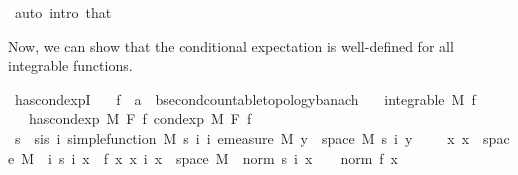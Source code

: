\begin{isabellebody}
\ {\isacharparenleft}{\kern0pt}auto\ intro{\isacharbang}{\kern0pt}{\isacharcolon}{\kern0pt}\ that{\isacharparenright}{\kern0pt}\isanewline
{}\isamarkupfalse%
%
\endisatagproof
{\isafoldproof}%
%
\isadelimproof
%
\endisadelimproof
%
\begin{isamarkuptext}%
Now, we can show that the conditional expectation is well-defined for all integrable functions.%
\end{isamarkuptext}\isamarkuptrue%
\isamarkupfalse%
\ has{\isacharunderscore}{\kern0pt}cond{\isacharunderscore}{\kern0pt}expI{\isacharcolon}{\kern0pt}\isanewline
\ \ \ f\ {\isacharcolon}{\kern0pt}{\isacharcolon}{\kern0pt}\ {\isachardoublequoteopen}{\isacharprime}{\kern0pt}a\ {\isasymRightarrow}\ {\isacharprime}{\kern0pt}b{\isacharcolon}{\kern0pt}{\isacharcolon}{\kern0pt}{\isacharbraceleft}{\kern0pt}second{\isacharunderscore}{\kern0pt}countable{\isacharunderscore}{\kern0pt}topology{\isacharcomma}{\kern0pt}banach{\isacharbraceright}{\kern0pt}{\isachardoublequoteclose}\isanewline
\ \ \ {\isachardoublequoteopen}integrable\ M\ f{\isachardoublequoteclose}\isanewline
\ \ \ {\isachardoublequoteopen}has{\isacharunderscore}{\kern0pt}cond{\isacharunderscore}{\kern0pt}exp\ M\ F\ f\ {\isacharparenleft}{\kern0pt}cond{\isacharunderscore}{\kern0pt}exp\ M\ F\ f{\isacharparenright}{\kern0pt}{\isachardoublequoteclose}\isanewline
%
\isadelimproof
%
\endisadelimproof
%
\isatagproof
{}\isamarkupfalse%
\ {\isacharminus}{\kern0pt}\isanewline
\ \ \isamarkupfalse%
\ s\ \ s{\isacharunderscore}{\kern0pt}is{\isacharcolon}{\kern0pt}\ {\isachardoublequoteopen}{\isasymAnd}i{\isachardot}{\kern0pt}\ simple{\isacharunderscore}{\kern0pt}function\ M\ {\isacharparenleft}{\kern0pt}s\ i{\isacharparenright}{\kern0pt}{\isachardoublequoteclose}\ {\isachardoublequoteopen}{\isasymAnd}i{\isachardot}{\kern0pt}\ emeasure\ M\ {\isacharbraceleft}{\kern0pt}y\ {\isasymin}\ space\ M{\isachardot}{\kern0pt}\ s\ i\ y\ {\isasymnoteq}\ {}{\isacharbraceright}{\kern0pt}\ {\isasymnoteq}\ {\isasyminfinity}{\isachardoublequoteclose}\ {\isachardoublequoteopen}{\isasymAnd}x{\isachardot}{\kern0pt}\ x\ {\isasymin}\ space\ M\ {\isasymLongrightarrow}\ {\isacharparenleft}{\kern0pt}{\isasymlambda}i{\isachardot}{\kern0pt}\ s\ i\ x{\isacharparenright}{\kern0pt}\ {\isasymlonglonglongrightarrow}\ f\ x{\isachardoublequoteclose}\ {\isachardoublequoteopen}{\isasymAnd}x\ i{\isachardot}{\kern0pt}\ x\ {\isasymin}\ space\ M\ {\isasymLongrightarrow}\ norm\ {\isacharparenleft}{\kern0pt}s\ i\ x{\isacharparenright}{\kern0pt}\ {\isasymle}\ {}\ {\isacharasterisk}{\kern0pt}\ norm\ {\isacharparenleft}{\kern0pt}f\ x{\isacharparenright}{\kern0pt}{\isachardoublequoteclose}\ \isamarkupfalse%

\end{isabellebody}
